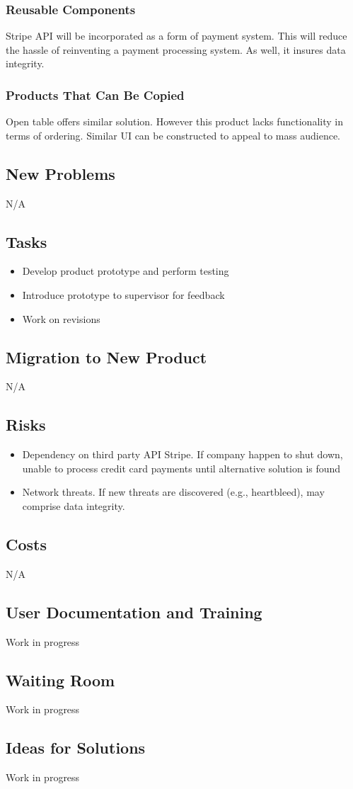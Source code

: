 \documentclass[12pt, titlepage]{article}
\begin{document}
\subsubsection{Reusable Components}
Stripe API will be incorporated as a form of payment system. This will reduce the hassle of reinventing a payment processing system. As well, it insures data integrity.
 \subsubsection{Products That Can Be Copied} 
Open table offers similar solution. However this product lacks functionality in terms of ordering. Similar UI can be constructed to appeal to mass audience.  
\subsection{New Problems}
N/A
\subsection{Tasks}
\begin{itemize}
  \item Develop product prototype and perform testing 
  \item Introduce prototype to supervisor for feedback
  \item 	Work on revisions
\end{itemize}
\subsection{Migration to New Product}
N/A
\subsection{Risks}
\begin{itemize}
  \item Dependency on third party API Stripe. If company happen to shut down, unable to process credit card payments until alternative solution is found
  \item Network threats. If new threats are discovered (e.g., heartbleed), may comprise data integrity. 
\end{itemize}
\subsection{Costs}
N/A
\subsection{User Documentation and Training}
Work in progress
\subsection{Waiting Room}
Work in progress
\subsection{Ideas for Solutions}
Work in progress
\end{document}
